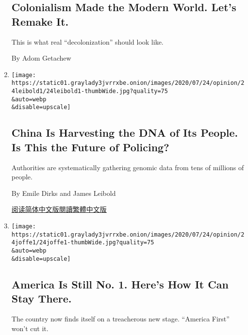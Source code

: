 \begin{enumerate}
  \hypertarget{colonialism-made-the-modern-world-lets-remake-it}{%
  \subsection{Colonialism Made the Modern World. Let's Remake
  It.}\label{colonialism-made-the-modern-world-lets-remake-it}}

  This is what real ``decolonization'' should look like.

  By Adom Getachew
\item
  \href{/2020/07/24/opinion/china-dna-police.html}{}

  \texttt{[image: https://static01.graylady3jvrrxbe.onion/images/2020/07/24/opinion/24leibold1/24leibold1-thumbWide.jpg?quality=75\\\&auto=webp\\\&disable=upscale]}

  \hypertarget{china-is-harvesting-the-dna-of-its-people-is-this-the-future-of-policing}{%
  \subsection{China Is Harvesting the DNA of Its People. Is This the
  Future of
  Policing?}\label{china-is-harvesting-the-dna-of-its-people-is-this-the-future-of-policing}}

  Authorities are systematically gathering genomic data from tens of
  millions of people.

  By Emile Dirks and James Leibold

  \href{https://cn.nytimes3xbfgragh.onion/opinion/20200728/china-dna-police/}{阅读简体中文版}\href{https://cn.nytimes3xbfgragh.onion/opinion/20200728/china-dna-police/zh-hant/}{閱讀繁體中文版}
\item
  \href{/2020/07/24/opinion/united-states-europe-china.html}{}

  \texttt{[image: https://static01.graylady3jvrrxbe.onion/images/2020/07/24/opinion/24joffe1/24joffe1-thumbWide.jpg?quality=75\\\&auto=webp\\\&disable=upscale]}

  \hypertarget{america-is-still-no-1-heres-how-it-can-stay-there}{%
  \subsection{America Is Still No. 1. Here's How It Can Stay
  There.}\label{america-is-still-no-1-heres-how-it-can-stay-there}}

  The country now finds itself on a treacherous new stage. ``America
  First'' won't cut it.


\end{enumerate}
